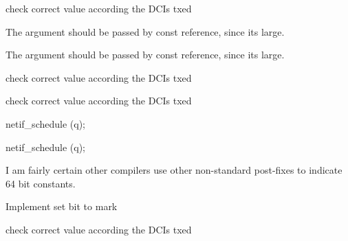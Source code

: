 \begin{DoxyRefList}
check correct value according the D\+C\+Is txed  
\item[\label{todo__todo000083}%
\hypertarget{todo__todo000083}{}%
Member \hyperlink{structns3_1_1PhyReceptionStatParameters_a5d088f40469543164effe500ad341cd3}{ns3\+:\+:Phy\+Reception\+Stat\+Parameters\+:\+:Traced\+Callback} )(const \hyperlink{structns3_1_1PhyReceptionStatParameters}{Phy\+Reception\+Stat\+Parameters} params)]The argument should be passed by const reference, since it\textquotesingle{}s large.  
\item[\label{todo__todo000082}%
\hypertarget{todo__todo000082}{}%
Member \hyperlink{structns3_1_1PhyTransmissionStatParameters_aebba0b6c1acfc474d50de729df924183}{ns3\+:\+:Phy\+Transmission\+Stat\+Parameters\+:\+:Traced\+Callback} )(const \hyperlink{structns3_1_1PhyTransmissionStatParameters}{Phy\+Transmission\+Stat\+Parameters} params)]The argument should be passed by const reference, since it\textquotesingle{}s large.  
\item[\label{todo__todo000107}%
\hypertarget{todo__todo000107}{}%
Member \hyperlink{classns3_1_1PssFfMacScheduler_a7b4e2fbe84bca59191c664a2b130b5b0}{ns3\+:\+:Pss\+Ff\+Mac\+Scheduler\+:\+:Do\+Sched\+Dl\+Trigger\+Req} (const struct \hyperlink{structns3_1_1FfMacSchedSapProvider_1_1SchedDlTriggerReqParameters}{Ff\+Mac\+Sched\+Sap\+Provider\+::\+Sched\+Dl\+Trigger\+Req\+Parameters} \&params)]check correct value according the D\+C\+Is txed 

check correct value according the D\+C\+Is txed  
\item[\label{todo__todo000161}%
\hypertarget{todo__todo000161}{}%
Member \hyperlink{classns3_1_1QueueDisc_a45cd8fdd2469b9e9d7551af22cfdb1a2}{ns3\+:\+:Queue\+Disc\+:\+:Requeue} (Ptr$<$ Queue\+Disc\+Item $>$ item)]netif\+\_\+schedule (q);  
\item[\label{todo__todo000160}%
\hypertarget{todo__todo000160}{}%
Member \hyperlink{classns3_1_1QueueDisc_a424eceba41cb013436f353c622c082ff}{ns3\+:\+:Queue\+Disc\+:\+:Run} (void)]netif\+\_\+schedule (q);  
\item[\label{todo__todo000006}%
\hypertarget{todo__todo000006}{}%
Member \hyperlink{classns3_1_1RealtimeSimulatorImpl_ae953042a2e0dcd7b08fc548cb7d1ced6}{ns3\+:\+:Realtime\+Simulator\+Impl\+:\+:Get\+Maximum\+Simulation\+Time} (void) const ]I am fairly certain other compilers use other non-\/standard post-\/fixes to indicate 64 bit constants.  
\item[\label{todo__todo000162}%
\hypertarget{todo__todo000162}{}%
Member \hyperlink{classns3_1_1RedQueueDisc_a8cf68bf93f0ad885f92e32c8269d33d3}{ns3\+:\+:Red\+Queue\+Disc\+:\+:Drop\+Early} (Ptr$<$ Queue\+Disc\+Item $>$ item, uint32\+\_\+t q\+Size)]Implement set bit to mark  
\item[\label{todo__todo000108}%
\hypertarget{todo__todo000108}{}%
Member \hyperlink{classns3_1_1RrFfMacScheduler_a185c818311c062bfc0af357e94d49e1e}{ns3\+:\+:Rr\+Ff\+Mac\+Scheduler\+:\+:Do\+Sched\+Dl\+Trigger\+Req} (const struct \hyperlink{structns3_1_1FfMacSchedSapProvider_1_1SchedDlTriggerReqParameters}{Ff\+Mac\+Sched\+Sap\+Provider\+::\+Sched\+Dl\+Trigger\+Req\+Parameters} \&params)]check correct value according the D\+C\+Is txed 


\end{DoxyRefList}
